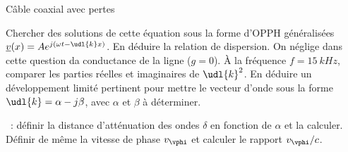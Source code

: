 \begin{exo}[PSI][2][TD]{Câble coaxial avec pertes}
\begin{quest}
\item Chercher des solutions de cette équation sous la forme d'OPPH généralisées $\underline{v}(x)= Ae^{j(\omega t-\udl{k}x)}$. En déduire la relation de dispersion. On néglige dans cette question da conductance de la ligne ($g=0$). À la fréquence $f=\SI{15}{kHz}$, comparer les parties réelles et imaginaires de $\udl{k}^2$. En déduire un développement limité pertinent pour mettre le vecteur d'onde sous la forme $\udl{k}=\alpha-j\beta$, avec $\alpha$ et $\beta$ à déterminer.


\item \AN~: définir la distance d'atténuation des ondes $\delta$ en fonction de $\alpha$ et la calculer. Définir de même la vitesse de phase $v_{\vphi}$ et calculer le rapport $v_{\vphi}/c$.
\end{quest}
\end{exo}

